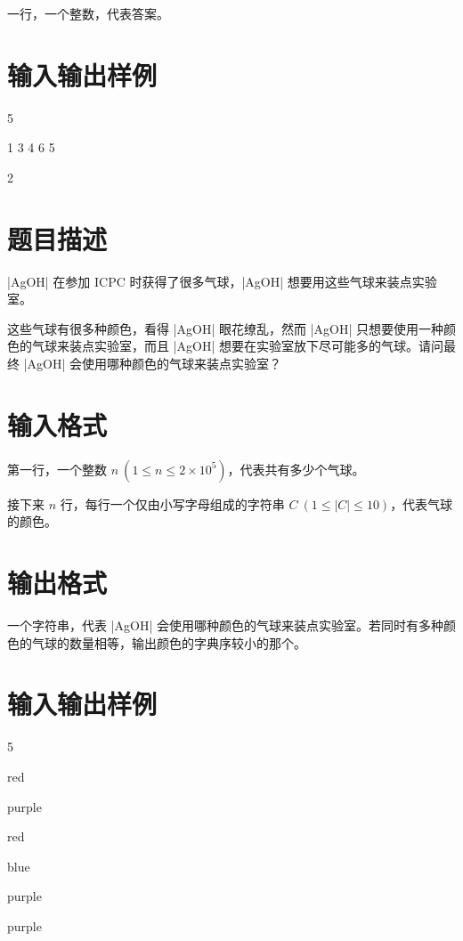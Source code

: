 \documentclass{ctpro}
\begin{document}
一行，一个整数，代表答案。

\section*{输入输出样例}
\testcasetab
{
	5\par
	1 3 4 6 5
}
{
	2
}

\makeproblem
\section*{题目描述}

|AgOH| 在参加 ICPC 时获得了很多气球，|AgOH| 想要用这些气球来装点实验室。

这些气球有很多种颜色，看得 |AgOH| 眼花缭乱，然而 |AgOH| 只想要使用一种颜色的气球来装点实验室，而且 |AgOH| 想要在实验室放下尽可能多的气球。请问最终 |AgOH| 会使用哪种颜色的气球来装点实验室？

\section*{输入格式}

第一行，一个整数 $n~(1 \leq n \leq 2 \times {10}^5)$，代表共有多少个气球。

接下来 $n$ 行，每行一个仅由小写字母组成的字符串 $C~(1 \leq \vert C \vert \leq 10)$，代表气球的颜色。

\section*{输出格式}

一个字符串，代表 |AgOH| 会使用哪种颜色的气球来装点实验室。若同时有多种颜色的气球的数量相等，输出颜色的字典序较小的那个。

\section*{输入输出样例}
\testcasetab
{
	5\par
	red\par
	purple\par
	red\par
	blue\par
	purple
}
{
	purple
}
\end{document}
